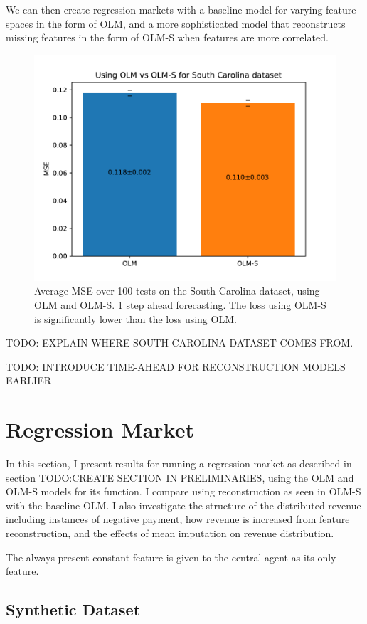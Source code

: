 We can then create regression markets with a baseline model for varying feature
spaces in the form of OLM, and a more sophisticated model that reconstructs
missing features in the form of OLM-S when features are more correlated.

\begin{figure}
  \centering
  \includegraphics[width=.7\linewidth]{Pictures/south_carolina.pdf}
  \caption{Average MSE over 100 tests on the South Carolina dataset, using OLM
    and OLM-S. 1 step ahead forecasting. The loss using OLM-S is significantly
    lower than the loss using OLM.}
  \label{fig:sc}
\end{figure}

TODO: EXPLAIN WHERE SOUTH CAROLINA DATASET COMES FROM.

TODO: INTRODUCE TIME-AHEAD FOR RECONSTRUCTION MODELS EARLIER

\section{Regression Market}
In this section, I present results for running a regression market as described
in section TODO:CREATE SECTION IN PRELIMINARIES, using the OLM and OLM-S models
for its function. I compare using reconstruction as seen in OLM-S with the
baseline OLM. I also investigate the structure of the distributed revenue
including instances of negative payment, how revenue is increased from feature
reconstruction, and the effects of mean imputation on revenue distribution.

The always-present constant feature is given to the central agent as its only feature.

\subsection{Synthetic Dataset}

